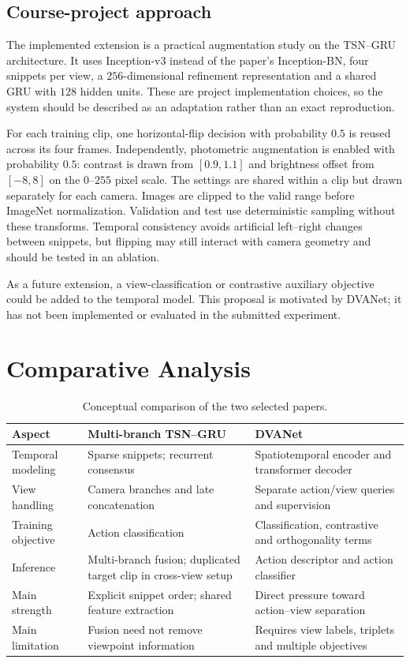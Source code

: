 \documentclass[runningheads]{llncs}
\begin{document}
\subsection{Course-project approach}
The implemented extension is a practical augmentation study on the TSN--GRU architecture. It uses Inception-v3 instead of the paper's Inception-BN, four snippets per view, a $256$-dimensional refinement representation and a shared GRU with $128$ hidden units. These are project implementation choices, so the system should be described as an adaptation rather than an exact reproduction.

For each training clip, one horizontal-flip decision with probability $0.5$ is reused across its four frames. Independently, photometric augmentation is enabled with probability $0.5$: contrast is drawn from $[0.9,1.1]$ and brightness offset from $[-8,8]$ on the $0$--$255$ pixel scale. The settings are shared within a clip but drawn separately for each camera. Images are clipped to the valid range before ImageNet normalization. Validation and test use deterministic sampling without these transforms. Temporal consistency avoids artificial left--right changes between snippets, but flipping may still interact with camera geometry and should be tested in an ablation.

As a future extension, a view-classification or contrastive auxiliary objective could be added to the temporal model. This proposal is motivated by DVANet; it has not been implemented or evaluated in the submitted experiment.

\section{Comparative Analysis}
\begin{table}[t]
\caption{Conceptual comparison of the two selected papers.}
\centering\small
\begin{tabular}{p{2.4cm}p{4.1cm}p{4.1cm}}
\hline
Aspect & Multi-branch TSN--GRU & DVANet\\\hline
Temporal modeling & Sparse snippets; recurrent consensus & Spatiotemporal encoder and transformer decoder\\
View handling & Camera branches and late concatenation & Separate action/view queries and supervision\\
Training objective & Action classification & Classification, contrastive and orthogonality terms\\
Inference & Multi-branch fusion; duplicated target clip in cross-view setup & Action descriptor and action classifier\\
Main strength & Explicit snippet order; shared feature extraction & Direct pressure toward action--view separation\\
Main limitation & Fusion need not remove viewpoint information & Requires view labels, triplets and multiple objectives\\\hline
\end{tabular}
\end{table}
\end{document}
